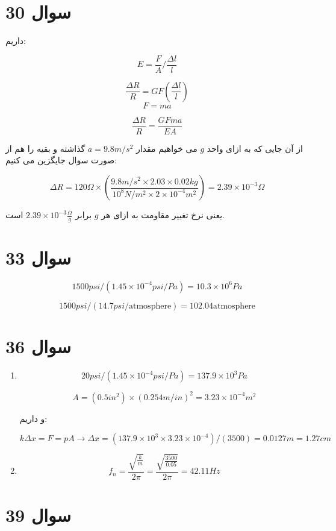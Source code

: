 \documentclass[12pt]{article}
\begin{document}
\section*{سوال 30}

داریم:

$$E = \frac{F}{A} / \frac{\Delta l}{l}$$

$$\frac{\Delta R} { R} = GF (\frac{\Delta l}{l})$$
$$F=ma$$

$$\frac{\Delta R}{R} = \frac{GF m a}{E A}$$

از آن جایی که به ازای واحد $g$ می خواهیم مقدار $a=9.8m/s^2$ گذاشته و بقیه را هم از صورت سوال جایگزین می کنیم:

$$\Delta R = 120 \Omega \times (\frac{9.8 m/s^2 \times 2.03 \times0.02 kg }{10^8 N/m^2 \times 2 \times 10^{-4} m^2}) = 2.39 \times 10^{-3} \Omega$$

یعنی نرخ تغییر مقاومت به ازای هر $g$ برابر 
$2.39 \times 10^{-3} \frac{\Omega}{g}$
است.


\section*{سوال 33}

$$1500 psi / (1.45 \times 10^{-4} psi/Pa) = 10.3 \times 10^6 Pa$$

$$1500 psi / (14.7 psi /\text{atmosphere}) =  102.04 \text{atmosphere}$$


\section*{سوال 36}

\begin{enumerate}
	\item 
	$$20psi / (1.45 \times 10^{-4} psi/Pa)= 137.9 \times 10^3 Pa$$
	
	$$A = (0.5 in^2) \times (0.254 m/in)^2 = 3.23 \times 10^{-4} m^2$$
	
	و داریم:
	
	$$k \Delta x = F = p A \rightarrow \Delta x = (137.9 \times 10^3 \times 3.23 \times 10^{-4})/(3500) = 0.0127 m = 1.27 cm$$
	
	\item
$$f_n = \frac{\sqrt{\frac{k}{m}}}{2 \pi } = \frac{\sqrt{\frac{3500}{0.05}}}{2 \pi } = 42.11 Hz$$
\end{enumerate}

\newpage

\section*{سوال 39}
\end{document}
